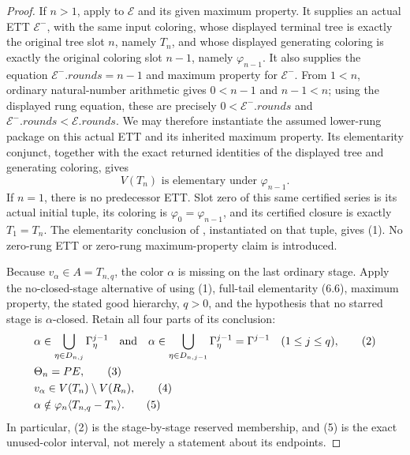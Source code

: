 \begin{proof}
If $n>1$, apply  to $\mathcal E$ and its
given maximum property.  It supplies an actual ETT $\mathcal E^{-}$, with
the same input coloring, whose displayed terminal tree is exactly the
original tree slot $n$, namely $T_n$, and whose displayed generating coloring
is exactly the original coloring slot $n-1$, namely $\varphi_{n-1}$.  It also
supplies the equation
$\mathcal E^{-}.\mathit{rounds}=n-1$ and maximum property for
$\mathcal E^{-}$.  From $1<n$, ordinary natural-number arithmetic gives
$0<n-1$ and $n-1<n$; using the displayed rung equation, these are precisely
$0<\mathcal E^{-}.\mathit{rounds}$ and
$\mathcal E^{-}.\mathit{rounds}<\mathcal E.\mathit{rounds}$.  We may therefore
instantiate the assumed lower-rung package on this actual ETT and its inherited
maximum property.  Its elementarity conjunct, together with the exact returned
identities of the displayed tree and generating coloring, gives
\[
             V(T_n)\text{ is elementary under }\varphi_{n-1}. \tag{1}
\]
If $n=1$, there is no predecessor ETT.  Slot zero of this same certified
series is its actual initial tuple, its coloring is
$\varphi_0=\varphi_{n-1}$, and its certified closure is exactly
$T_1=T_n$.  The elementarity conclusion of
, instantiated on that tuple, gives (1).
No zero-rung ETT or zero-rung maximum-property claim is introduced.

Because $v_\alpha\in A=T_{n,q}$, the color $\alpha$ is missing on the
last ordinary stage.  Apply the no-closed-stage alternative of
 using (1), full-tail elementarity (6.6), maximum property,
the stated good hierarchy, $q>0$, and the hypothesis that no starred stage
is $\alpha$-closed.  Retain all four parts of its conclusion:
\[
\begin{split}
 &\alpha\in
   \bigcup_{\eta\in D_{n,j}}\Gamma^{j-1}_\eta
   \quad\hbox{and}\quad
   \alpha\in\bigcup_{\eta\in D_{n,j-1}}\Gamma^{j-1}_\eta
   =\Gamma^{j-1} \quad(1\leq j\leq q),                         \tag{2}\\
 &\Theta_n=PE,                                                   \tag{3}\\
 &v_\alpha\in V(T_n)\setminus V(R_n),                           \tag{4}\\
 &\alpha\notin
      \varphi_n\langle T_{n,q}-T_n\rangle.                      \tag{5}
\end{split}
\]
In particular, (2) is the stage-by-stage reserved membership, and (5)
is the exact unused-color interval, not merely a statement about its
endpoints.


\end{proof}
